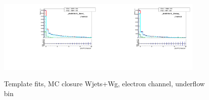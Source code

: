 \begin{figure}[htb]
  \begin{center}
   \includegraphics[width=0.45\textwidth]{../figs/figs_v11/ELECTRON_WGamma/MCclosureWjetsPlusWg/c_TEMPL_CHISO_UNblind__phoEt10to15__Barrel__RooFit_MCclosure.pdf}\includegraphics[width=0.45\textwidth]{../figs/figs_v11/ELECTRON_WGamma/MCclosureWjetsPlusWg/c_TEMPL_CHISO_UNblind__phoEt10to15__Endcap__RooFit_MCclosure.pdf}\\
  \label{fig:templateFits_MCclosureWjetsPlusWg_CHISO_ELECTRON_0}
  \caption{Template fits, MC closure Wjets+Wg, electron channel, underflow bin}
  \end{center}
\end{figure}

